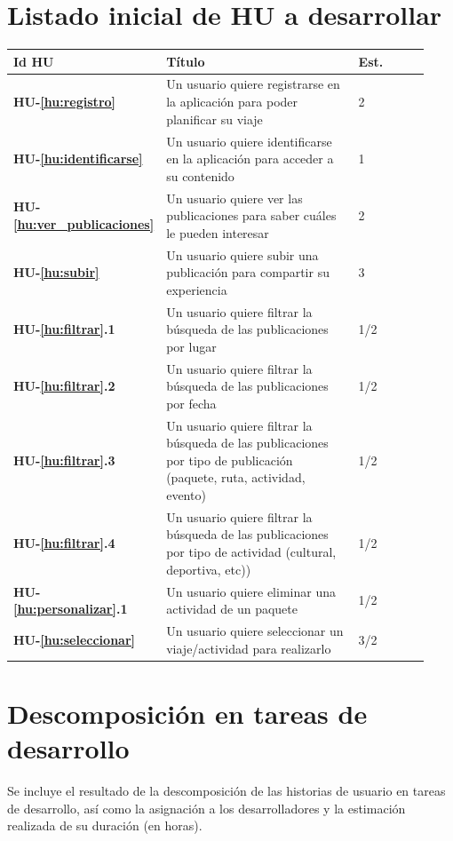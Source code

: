 \documentclass[11pt]{article}
\begin{document}
\section{Listado inicial de HU a desarrollar}
\begin{longtable}{p{0.13\linewidth}p{0.65\linewidth}p{0.05\linewidth}p{0.05\linewidth}p{0.05\linewidth}}
	\toprule
	\textbf{Id HU} & \textbf{Título} & \textbf{Est.}\\
	\midrule
	\textbf{HU-\ref{hu:registro}} & Un usuario quiere registrarse en la aplicación para poder planificar su viaje & 2\\
	\textbf{HU-\ref{hu:identificarse}} & Un usuario quiere identificarse en la aplicación para  acceder a su contenido & 1\\
	\textbf{HU-\ref{hu:ver_publicaciones}} & Un usuario quiere ver las publicaciones para saber cuáles le pueden interesar & 2\\
	\textbf{HU-\ref{hu:subir}} & Un usuario quiere subir una publicación para compartir su experiencia & 3\\
	\textbf{HU-\ref{hu:filtrar}.1} & Un usuario quiere filtrar la búsqueda de las publicaciones por lugar & 1/2 \\ 
	\textbf{HU-\ref{hu:filtrar}.2} & Un usuario quiere filtrar la búsqueda de las publicaciones por fecha & 1/2 \\
	\textbf{HU-\ref{hu:filtrar}.3} & Un usuario quiere filtrar la búsqueda de las publicaciones por tipo de publicación (paquete, ruta, actividad, evento) & 1/2 \\
	\textbf{HU-\ref{hu:filtrar}.4} & Un usuario quiere filtrar la búsqueda de las publicaciones por tipo de actividad (cultural, deportiva, etc)) & 1/2 \\
	\textbf{HU-\ref{hu:personalizar}.1} & Un usuario quiere eliminar una actividad de un paquete & 1/2\\ 
	\textbf{HU-\ref{hu:seleccionar}} & Un usuario quiere seleccionar un viaje/actividad para realizarlo & 3/2 \\
	\bottomrule
\end{longtable}

\section{Descomposición en tareas de desarrollo}
Se incluye el resultado de la descomposición de las historias de usuario en tareas de desarrollo, así como la asignación a los desarrolladores y la estimación realizada de su duración (en horas).
\end{document}
